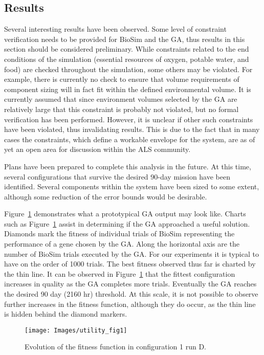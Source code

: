 \documentclass[submit]{aiaa}
\begin{document}
\subsection{Results}

Several interesting results have been observed. 
Some level of constraint verification needs to be provided for BioSim and the GA,  thus results in this section should be considered preliminary.
While constraints related to the end conditions of the simulation (essential resources of oxygen, potable water, and food) are checked throughout the simulation, some others may be violated.
For example, there is currently no check to ensure that volume requirements of component sizing will in fact fit within the defined environmental volume.
It is currently assumed that since environment volumes selected by the GA are relatively large that this constraint is probably not violated, but no formal verification has been performed.
However, it is unclear if other such constraints have been violated, thus invalidating results.
This is due to the fact that in many cases the constraints, which define a workable envelope for the system, are as of yet an open area for discussion within the ALS community.

Plans have been prepared to complete this analysis in the future.
At this time, several configurations that survive the desired 90-day
mission have been identified.  
Several components within the system have been sized to some extent, although
some reduction of the error bounds would be desirable.

Figure~\ref{fig:utilityFig} demonstrates what a prototypical GA output
may look like. Charts such as Figure~\ref{fig:utilityFig} assist in
determining if the GA approached a useful solution. 
Diamonds mark the fitness of individual trials of BioSim representing
the performance of a gene chosen by the GA.  
Along the horizontal axis are
the number of BioSim trials executed by the GA. For our experiments it
is typical to have on the order of 1000 trials. The best fitness
observed thus far is charted by the thin line. It can be observed in
Figure~\ref{fig:utilityFig} that the fittest configuration increases
in quality as the GA completes more trials. 
Eventually the GA reaches the desired 90 day (2160 hr) threshold. 
At this scale, it is not possible to observe further increases in the fitness function,
although they do occur, as the thin line is hidden behind the diamond
markers.

\begin{figure}[htb]
\texttt{[image: Images/utility\_fig1]}
\caption{Evolution of the fitness function in configuration 1 run D.}
\label{fig:utilityFig}
\end{figure}
\end{document}

